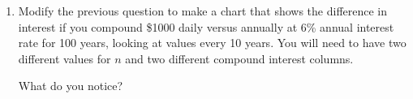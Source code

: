 \documentclass[12pt]{article}
\newcommand{\ee}{\end{enumerate}}
\begin{document}
\begin{enumerate}
\item Modify the previous question to make a chart that shows the difference in interest if you compound \$1000 daily versus annually at 6\% annual interest rate for 100 years, looking at values every 10 years. You will need to have two different values for $n$ and two different compound interest columns.

What do you notice?
\vfill

%
%

\ee
\end{document}
